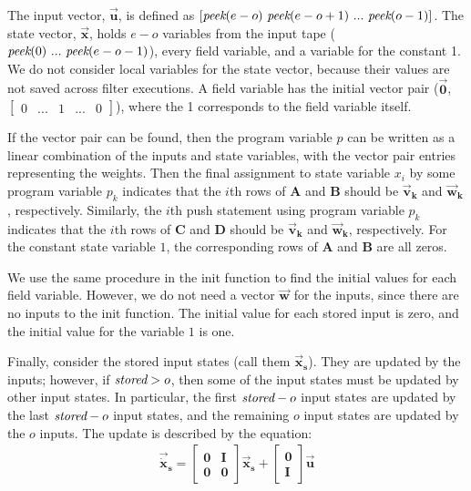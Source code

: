 The input vector, $\vec{\mathbf{u}}$, is defined as $[\mbox{\it peek}(e-o)
~\mbox{\it peek}(e-o+1) ~... ~\mbox{\it peek}(o-1)]$. The state vector,
$\vec{\mathbf{x}}$, holds $e-o$ variables from the input tape
($\mbox{\it peek}(0) ~... ~\mbox{\it peek}(e-o-1)$), every field variable, and a
variable for the constant 1. We do not consider local variables
for the state vector, because their values are not saved across
filter executions. 
A field variable has the initial vector
pair ($\vec{\mathbf{0}}$,$\left [
\begin{array} {ccccc} 0 & ... & 1 & ... & 0 \end{array} \right
]$), where the 1 corresponds to the field variable itself.

If the vector pair can be found, then the program variable $p$ can be
written as a linear combination of the inputs and state variables,
with the vector pair entries representing the weights.  Then the final
assignment to state variable $x_i$ by some program variable $p_k$
indicates that the $i$th rows of $\mathbf{A}$ and $\mathbf{B}$ should
be $\vec{\mathbf{v}}_\mathbf{k}$ and $\vec{\mathbf{w}}_\mathbf{k}$,
respectively. Similarly, the $i$th push statement using program
variable $p_k$ indicates that the $i$th rows of $\mathbf{C}$ and
$\mathbf{D}$ should be $\vec{\mathbf{v}}_\mathbf{k}$ and
$\vec{\mathbf{w}}_\mathbf{k}$, respectively. For the constant state
variable $1$, the corresponding rows of $\mathbf{A}$ and $\mathbf{B}$
are all zeros.

We use the same procedure in the init function to find the initial
values for each field variable.  However, we do not need a vector
$\vec{\mathbf{w}}$ for the inputs, since there are no inputs to the
init function. The initial value for each stored input is zero, and
the initial value for the variable $1$ is one.

Finally, consider the stored input states (call them
$\vec{\mathbf{x}}_\mathbf{s}$). They are updated by the inputs;
however, if $\mbox{\it stored} > o$, then some of the input states must be
updated by other input states. In particular, the first $\mbox{\it stored}-o$
input states are updated by the last $\mbox{\it stored}-o$ input states, and the
remaining $o$ input states are updated by the $o$ inputs. The update
is described by the equation:
\begin{eqnarray}
\label{eq:one}
\vec{\dot{\mathbf{x}}}_\mathbf{s} = \left [
\begin{array} {cc} \mathbf{0} & \mathbf{I} \\ \mathbf{0} &
\mathbf{0} \end{array} \right ] \vec{\mathbf{x}}_\mathbf{s} + \left [
\begin{array} {c} \mathbf{0} \\ \mathbf{I} \end{array} \right ]
\vec{\mathbf{u}}
\end{eqnarray}

